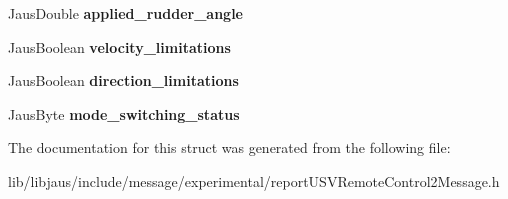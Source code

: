\begin{DoxyCompactItemize}
\item 
\hypertarget{struct_report_u_s_v_remote_control2_message_struct_a8acce6e76a19ed371a66938f67665514}{\-Jaus\-Double {\bfseries applied\-\_\-rudder\-\_\-angle}}\label{struct_report_u_s_v_remote_control2_message_struct_a8acce6e76a19ed371a66938f67665514}

\item 
\hypertarget{struct_report_u_s_v_remote_control2_message_struct_a1f837c8b8af534fd923ff138bafa502b}{\-Jaus\-Boolean {\bfseries velocity\-\_\-limitations}}\label{struct_report_u_s_v_remote_control2_message_struct_a1f837c8b8af534fd923ff138bafa502b}

\item 
\hypertarget{struct_report_u_s_v_remote_control2_message_struct_a5ddd25543b5b04c8a825b2bb655f912e}{\-Jaus\-Boolean {\bfseries direction\-\_\-limitations}}\label{struct_report_u_s_v_remote_control2_message_struct_a5ddd25543b5b04c8a825b2bb655f912e}

\item 
\hypertarget{struct_report_u_s_v_remote_control2_message_struct_af71adbbb57dcd2d8cdc111bcfb023718}{\-Jaus\-Byte {\bfseries mode\-\_\-switching\-\_\-status}}\label{struct_report_u_s_v_remote_control2_message_struct_af71adbbb57dcd2d8cdc111bcfb023718}

\end{DoxyCompactItemize}


\-The documentation for this struct was generated from the following file\-:\begin{DoxyCompactItemize}
\item 
lib/libjaus/include/message/experimental/report\-U\-S\-V\-Remote\-Control2\-Message.\-h\end{DoxyCompactItemize}
